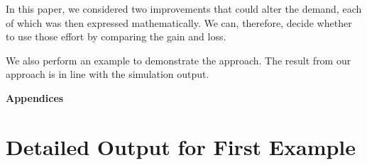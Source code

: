 \documentclass[a4paper,11pt]{article}
\begin{document}
In this paper, we considered two improvements that could alter the demand, each of which was then expressed mathematically. We can, therefore, decide whether to use those effort by comparing the gain and loss.

We also perform an example to demonstrate the approach. The result from our approach is in line with the simulation output.

\printbibliography
\newpage
\begin{center}
{\bf\Large Appendices}
\end{center}

\appendix

\section{Detailed Output for First Example} \label{se:report}
\end{document}
